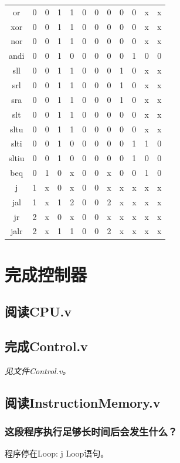 \documentclass{article}
\begin{document}
\begin{longtable}{cccccccccccc}
                or    & 0 & 0 & 1 & 1 & 0 & 0 & 0 & 0 & 0 & x & x \\
                xor   & 0 & 0 & 1 & 1 & 0 & 0 & 0 & 0 & 0 & x & x \\
                nor   & 0 & 0 & 1 & 1 & 0 & 0 & 0 & 0 & 0 & x & x \\
                andi  & 0 & 0 & 1 & 0 & 0 & 0 & 0 & 0 & 1 & 0 & 0 \\
                sll   & 0 & 0 & 1 & 1 & 0 & 0 & 0 & 1 & 0 & x & x \\
                srl   & 0 & 0 & 1 & 1 & 0 & 0 & 0 & 1 & 0 & x & x \\
                sra   & 0 & 0 & 1 & 1 & 0 & 0 & 0 & 1 & 0 & x & x \\
                slt   & 0 & 0 & 1 & 1 & 0 & 0 & 0 & 0 & 0 & x & x \\
                sltu  & 0 & 0 & 1 & 1 & 0 & 0 & 0 & 0 & 0 & x & x \\
                slti  & 0 & 0 & 1 & 0 & 0 & 0 & 0 & 0 & 1 & 1 & 0 \\
                sltiu & 0 & 0 & 1 & 0 & 0 & 0 & 0 & 0 & 1 & 0 & 0 \\
                beq   & 0 & 1 & 0 & x & 0 & 0 & x & 0 & 0 & 1 & 0 \\
                j     & 1 & x & 0 & x & 0 & 0 & x & x & x & x & x \\
                jal   & 1 & x & 1 & 2 & 0 & 0 & 2 & x & x & x & x \\
                jr    & 2 & x & 0 & x & 0 & 0 & x & x & x & x & x \\
                jalr  & 2 & x & 1 & 1 & 0 & 0 & 2 & x & x & x & x
            \end{longtable}
    \section{完成控制器}
        \subsection{阅读CPU.v}
        \subsection{完成Control.v}
            \emph{见文件Control.v。}
        \subsection{阅读InstructionMemory.v}
            \subsubsection*{这段程序执行足够长时间后会发生什么？}
            程序停在Loop: j Loop语句。
\end{document}
